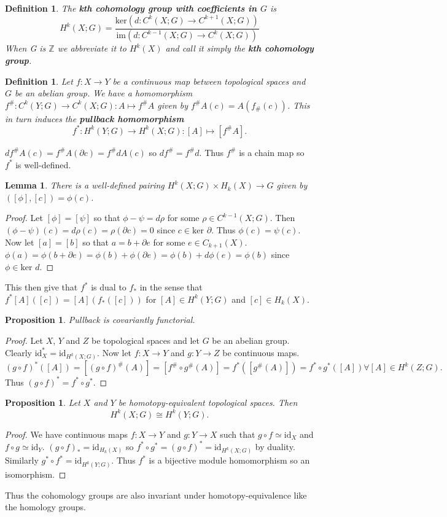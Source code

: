 \documentclass{article}
\newtheorem{definition}[theorem]{Definition}
\newtheorem{lemma}[theorem]{Lemma}
\newtheorem{proposition}[theorem]{Proposition}
\begin{document}
\begin{definition}
The \textbf{kth cohomology group with coefficients in $G$} is \[H^k(X;G)=\frac{\text{ker}(d\colon C^k(X;G)\to C^{k+1}(X;G))}{\text{im}(d\colon C^{k-1}(X;G)\to C^k(X;G))}\] When G is $\mathbb{Z}$ we abbreviate it to $H^k(X)$ and call it simply the \textbf{kth cohomology group}.
\end{definition}

\begin{definition}
Let $f\colon X\to Y$ be a continuous map between topological spaces and $G$ be an abelian group. We have a homomorphism $f^\#\colon C^k(Y;G)\to C^k(X;G):A\mapsto f^\# A$ given by $f^\# A(c)=A(f_\#(c))$. This in turn induces the \textbf{pullback homomorphism} \[f^*\colon H^k(Y;G)\to H^k(X;G):[A]\mapsto [f^\# A].\]
\end{definition}
\noindent $df^\# A(c)=f^\# A(\partial c)=f^\# dA(c)$ so $df^\#=f^\# d$. Thus $f^\#$ is a chain map so $f^*$ is well-defined.

\begin{lemma}
There is a well-defined pairing $H^k(X;G)\times H_k(X)\to G$ given by $([\phi],[c])=\phi(c)$.
\end{lemma}
\begin{proof}
Let $[\phi]=[\psi]$ so that $\phi-\psi=d\rho$ for some $\rho\in C^{k-1}(X;G)$. Then $(\phi-\psi)(c)=d\rho(c)=\rho(\partial c)=0$ since $c\in\text{ker }\partial$. Thus $\phi(c)=\psi(c)$.
Now let $[a]=[b]$ so that $a=b+\partial e$ for some $e\in C_{k+1}(X)$. $\phi(a)=\phi(b+\partial e)=\phi(b)+\phi(\partial e)=\phi(b)+d\phi(e)=\phi(b)$ since $\phi\in\text{ker }d$.
\end{proof}

\noindent This then give that $f^*$ is dual to $f_*$ in the sense that $f^*[A]([c])=[A](f_*([c]))$ for $[A]\in H^k(Y;G)$ and $[c]\in H_k(X)$.

\begin{proposition}
Pullback is covariantly functorial.
\end{proposition}
\begin{proof}
Let $X$, $Y$ and $Z$ be topological spaces and let $G$ be an abelian group. 
Clearly $\text{id}_X^*=\text{id}_{H^k(X;G)}$.
Now let $f\colon X\to Y$ and $g\colon Y\to Z$ be continuous maps. \[(g\circ f)^*([A])=[(g\circ f)^\#(A)]=[f^\#\circ g^\#(A)]=f^*([g^\#(A)])=f^*\circ g^*([A])\forall [A]\in H^k(Z;G).\] Thus $(g\circ f)^*=f^*\circ g^*$.
\end{proof}

\begin{proposition}
Let $X$ and $Y$ be homotopy-equivalent topological spaces. Then \[H^k(X;G)\cong H^k(Y;G).\]
\end{proposition}
\begin{proof}
We have continuous maps $f\colon X\to Y$ and $g\colon Y\to X$ such that $g\circ f\simeq\text{id}_X$ and $f\circ g\simeq\text{id}_Y$. $(g\circ f)_*=\text{id}_{H_k(X)}$ so $f^*\circ g^*=(g\circ f)^*=\text{id}_{H^k(X;G)}$ by duality. Similarly $g^*\circ f^*=\text{id}_{H^k(Y;G)}$. Thus $f^*$ is a bijective module homomorphism so an isomorphism.
\end{proof}
\noindent Thus the cohomology groups are also invariant under homotopy-equivalence like the homology groups.
\end{document}
